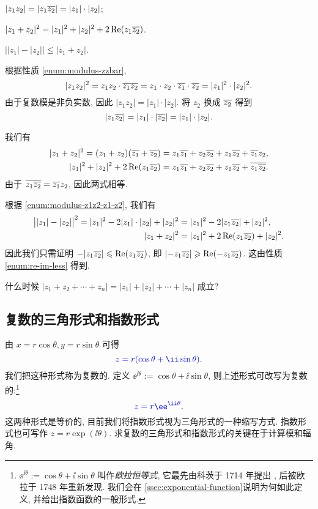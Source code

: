\begin{exampleenum}[证明:]
  \item $|z_1z_2|=|z_1\overline{z_2}|=|z_1|\cdot|z_2|$;
  \label{enum:modulus-z1z2-z1-z2}
  \item $|z_1+z_2|^2=|z_1|^2+|z_2|^2+2\operatorname{Re}(z_1\overline{z_2})$.
  \item $\bigl||z_1|-|z_2|\bigr|\le|z_1+z_2|$.
\end{exampleenum}

\begin{proofenumr}
  \item 根据性质 \ref{enum:modulus-zzbar},
  \[
      |z_1z_2|^2=z_1z_2\cdot\overline{z_1}\overline{z_2}
    =z_1\cdot z_2\cdot \overline{z_1}\cdot \overline{z_2}
    =|z_1|^2\cdot|z_2|^2.
  \]
  由于复数模是非负实数, 因此 $|z_1z_2|=|z_1|\cdot|z_2|$.
  将 $z_2$ 换成 $\overline{z_2}$ 得到
  \[
      |z_1\overline{z_2}|
    =|z_1|\cdot|\overline{z_2}|
    =|z_1|\cdot|z_2|.
  \]
  \item 我们有
  \begin{align*}
      |z_1+z_2|^2
    =(z_1+z_2)(\overline{z_1}+\overline{z_2})&
    =z_1\overline{z_1}+z_2\overline{z_2}+z_1\overline{z_2}+\overline{z_1}z_2,\\
      |z_1|^2+|z_2|^2+2\operatorname{Re}(z_1\overline{z_2})&
    =z_1\overline{z_1}+z_2\overline{z_2}+z_1\overline{z_2}+\overline{z_1\overline{z_2}}.
  \end{align*}
  由于 $\overline{z_1\overline{z_2}}=\overline{z_1}z_2$, 因此两式相等.
  \item 根据 \ref{enum:modulus-z1z2-z1-z2}, 我们有
  \begin{align*}
      \bigl||z_1|-|z_2|\bigr|^2
    =|z_1|^2-2|z_1|\cdot|z_2|+|z_2|^2&
    =|z_1|^2-2|z_1 \overline{z_2}|+|z_2|^2,\\
      |z_1+z_2|^2&
    =|z_1|^2+2\operatorname{Re}(z_1 \overline{z_2})+|z_2|^2.
  \end{align*}
  因此我们只需证明 $-|z_1 \overline{z_2}|\leqslant \operatorname{Re}(z_1 \overline{z_2})$, 即 $|{-z_1 \overline{z_2}}|\geqslant \operatorname{Re}(-z_1 \overline{z_2})$.
  这由性质 \ref{enum:re-im-less} 得到.
  \qedhere
\end{proofenumr}

\begin{exercise}
  什么时候 $|z_1+z_2+\cdots+z_n|=|z_1|+|z_2|+\cdots+|z_n|$ 成立?
\end{exercise}


\subsection{复数的三角形式和指数形式}

由 $x=r\cos\theta,y=r\sin\theta$ 可得
\[
  \color{main}z=r(\cos\theta+\ii\sin\theta).
\]
我们把这种形式称为复数的.
定义 \alert{$\ee^{\ii\theta}:=\cos\theta+\ii\sin\theta$}, 则上述形式可改写为复数的:\footnote{%
  $\ee^{\ii\theta}:=\cos\theta+\ii\sin\theta$ 叫作\emph{欧拉恒等式}, 它最先由科茨于 1714 年提出 \cite[第19章3节]{Kline1990b}, 后被欧拉于 1748 年重新发现.
  我们会在 \ref{ssec:exponential-function}说明为何如此定义, 并给出指数函数的一般形式.
}
\[
  \color{main}z=r\ee^{\ii\theta}.
\]
这两种形式是等价的, 目前我们将指数形式视为三角形式的一种缩写方式.
指数形式也可写作 $z=r\exp(\ii\theta)$.
求复数的三角形式和指数形式的\alert{关键在于计算模和辐角}.

